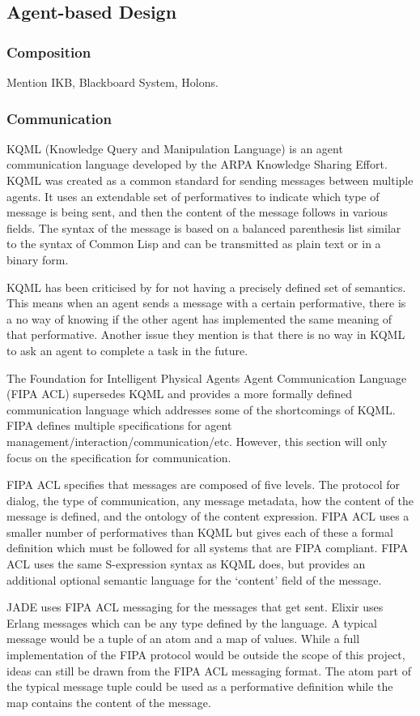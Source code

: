 \subsection{Agent-based Design}

\subsubsection{Composition}

Mention IKB, Blackboard System, Holons.

\subsubsection{Communication}

KQML (Knowledge Query and Manipulation Language) is an agent communication language developed by the ARPA Knowledge Sharing Effort.
KQML was created as a common standard for sending messages between multiple agents.
It uses an extendable set of performatives to indicate which type of message is being sent, and then the content of the message follows in various fields.
The syntax of the message is based on a balanced parenthesis list similar to the syntax of Common Lisp and can be transmitted as plain text or in a binary form.~\cite{finin1994kqml}

KQML has been criticised by  for not having a precisely defined set of semantics.
This means when an agent sends a message with a certain performative, there is a no way of knowing if the other agent has implemented the same meaning of that performative.
Another issue they mention is that there is no way in KQML to ask an agent to complete a task in the future.

The Foundation for Intelligent Physical Agents Agent Communication Language (FIPA ACL) supersedes KQML and provides a more formally defined communication language which addresses some of the shortcomings of KQML\@.
FIPA defines multiple specifications for agent management/interaction/communication/etc.
However, this section will only focus on the specification for communication.

FIPA ACL specifies that messages are composed of five levels.
The protocol for dialog, the type of communication, any message metadata, how the content of the message is defined, and the ontology of the content expression.
FIPA ACL uses a smaller number of performatives than KQML but gives each of these a formal definition which must be followed for all systems that are FIPA compliant.
FIPA ACL uses the same S-expression syntax as KQML does, but provides an additional optional semantic language for the `content' field of the message.~\cite{obrien1998fipa}

JADE uses FIPA ACL messaging for the messages that get sent.
Elixir uses Erlang messages which can be any type defined by the language.
A typical message would be a tuple of an atom and a map of values.
While a full implementation of the FIPA protocol would be outside the scope of this project, ideas can still be drawn from the FIPA ACL messaging format.
The atom part of the typical message tuple could be used as a performative definition while the map contains the content of the message.
